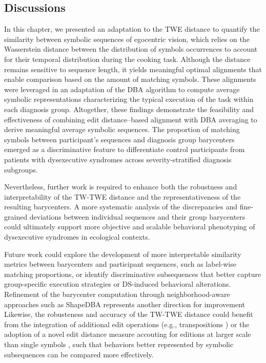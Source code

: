 \begin{chapterabstract}
\section{Discussions}
    \label{sec:chapter_6_conclusion}

    In this chapter, we presented an adaptation to the TWE distance to quantify the similarity between symbolic sequences of egocentric vision, which relies on the Wasserstein distance between the distribution of symbols occurrences to account for their temporal distribution during the cooking task. Although the distance remains sensitive to sequence length, it yields meaningful optimal alignments that enable comparison based on the amount of matching symbols. These alignments were leveraged in an adaptation of the DBA algorithm to compute average symbolic representations characterizing the typical execution of the task within each diagnosis group. Altogether, these findings demonstrate the feasibility and effectiveness of combining edit distance–based alignment with DBA averaging to derive meaningful average symbolic sequences. The proportion of matching symbols between participant's sequences and diagnosis group barycenters emerged as a discriminative feature to differentiate control participants from patients with dysexecutive syndromes across severity-stratified diagnosis subgroups.
    
    Nevertheless, further work is required to enhance both the robustness and interpretability of the TW-TWE distance and the representativeness of the resulting barycenters. A more systematic analysis of the discrepancies and fine-grained deviations between individual sequences and their group barycenters could ultimately support more objective and scalable behavioral phenotyping of dysexecutive syndromes in ecological contexts.

    Future work could explore the development of more interpretable similarity metrics between barycenters and participant sequences, such as label-wise matching proportions, or identify discriminative subsequences that better capture group-specific execution strategies or DS-induced behavioral alterations.  Refinement of the barycenter computation through neighborhood-aware approaches such as ShapeDBA \cite{fawaz2023shapedba} represents another direction for improvement  Likewise, the robusteness and accuracy of the TW-TWE distance could benefit from the integration of additional edit operations (e.g., transpositions \cite{Damerau1964}) or the adoption of a novel edit distance measure accouting for editions at larger scale than single symbols \cite{Petty2022}, such that behaviors better represented by symbolic subsequences can be compared more effectively.




\end{chapterabstract}
